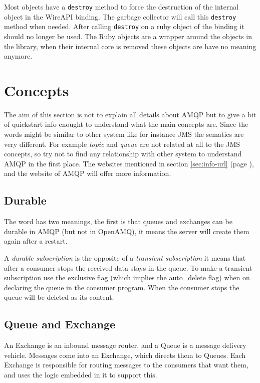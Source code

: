 \documentclass[a4paper,twoside]{article}
\begin{document}
Most objects have a {\tt destroy} method to force the destruction 
of the internal object in the WireAPI binding. The garbage collector 
will call this {\tt destroy} method when needed. After calling 
{\tt destroy} on a ruby object of the binding it should no longer
be used. The Ruby objects are a wrapper around the objects in the
library, when their internal core is removed these objects are have
no meaning anymore.


\section{Concepts}

The aim of this section is not to explain all details about 
AMQP but to give a bit of quickstart info enought to understand
what the main concepts are. Since the words might be similar
to other system like for instance JMS  the sematics
are very different. For example \emph{topic} and \emph{queue} 
are not related at all to the JMS concepts, so try not to 
find any relationship with other system to understand AMQP 
in the first place. The websites mentioned in section 
\ref{sec:info-url} (page \pageref{sec:info-url}), and the 
website of AMQP will offer more information.

\subsection{Durable}

The word has two meanings, the first is that queues and exchanges
can be durable in AMQP (but not in OpenAMQ), it means the server
will create them again after a restart.

A \emph{durable subscription}  is the opposite of a 
\emph{transient subscription} it means that 
after a consumer stops the received data stays in the queue. To 
make a transient subscription use the exclusive flag (which implies 
the  auto\_delete flag) when on declaring the queue in the 
consumer program. When the consumer stops the queue will 
be deleted as its content.



\subsection{Queue and Exchange}
An Exchange is an inbound message router, and a 
Queue is a message delivery vehicle. Messages come 
into an Exchange, which directs them to Queues. Each 
Exchange is responsible for routing messages to the 
consumers that want them, and uses the logic embedded 
in it to support this.
\end{document}
